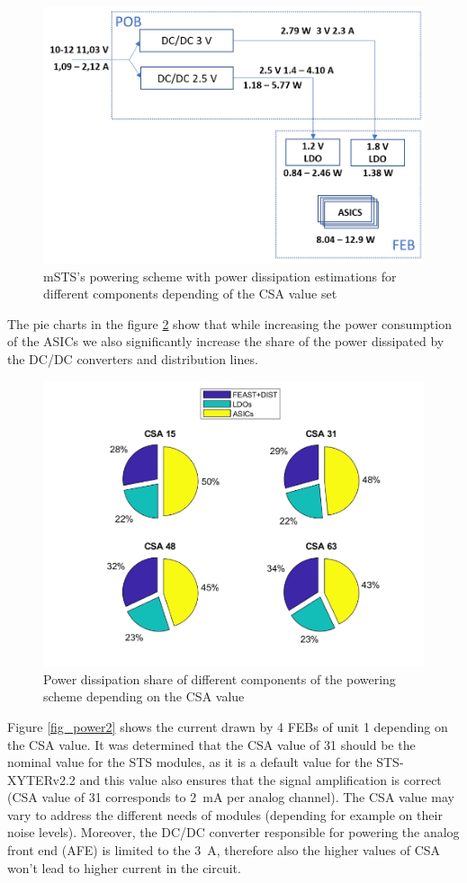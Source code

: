  
\begin{figure}[h!]
\centering
\includegraphics[width=0.65\columnwidth]{Chapter6/DCS/images/POB.png}
\caption{mSTS's powering scheme with power dissipation estimations for different components depending of the \gls{CSA} value set}
\label{fig_power_scheme}
\end{figure}


The pie charts in the figure \ref{fig_power_CSA} show that while increasing the power consumption of the \gls{ASIC}s we also significantly increase the share of the power dissipated by the DC/DC converters and distribution lines. %
\newpage
\begin{figure}[h!]
\centering
\includegraphics[width=0.7\columnwidth]{Chapter6/DCS/images/POBpie.png}
\caption{Power dissipation share of different components of the powering scheme depending on the \gls{CSA} value}
\label{fig_power_CSA}
\end{figure}
Figure \ref{fig_power2} shows the current drawn by 4 \glspl{FEB} of unit 1 depending on the \gls{CSA} value. It was determined that the \gls{CSA} value of 31 should be the nominal value for the \gls{STS} modules, as it is a default value for the STS-XYTERv2.2 and this value also ensures that the signal amplification is correct (\gls{CSA} value of 31 corresponds to 2~mA per analog channel). The \gls{CSA} value may vary to address the different needs of modules (depending for example on their noise levels).  Moreover, the DC/DC converter responsible for powering the analog front end (\gls{AFE}) is limited to the 3~A, therefore also the higher values of \gls{CSA} won't lead to higher current in the circuit.

